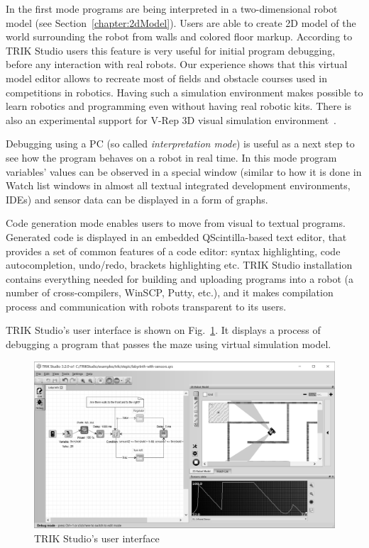 \documentclass[conference]{IEEEtran}
\begin{document}
In the first mode programs are being interpreted in a two-dimensional robot model (see Section~\ref{chapter:2dModel}). Users are able to create 2D model of the world surrounding the robot from walls and colored floor markup. According to TRIK Studio users this feature is very useful for initial program debugging, before any interaction with real robots. Our experience shows that this virtual model editor allows to recreate most of fields and obstacle courses used in competitions in robotics. Having such a simulation environment makes possible to learn robotics and programming even without having real robotic kits. There is also an experimental support for V-Rep 3D visual simulation environment~\cite{rohmer2013v}.

Debugging using a PC (so called \textit{interpretation mode}) is useful as a next step to see how the program behaves on a robot in real time. In this mode program variables' values can be observed in a special window (similar to how it is done in Watch list windows in almost all textual integrated development environments, IDEs) and sensor data can be displayed in a form of graphs. 

Code generation mode enables users to move from visual to textual programs. Generated code is displayed in an embedded QScintilla-based text editor, that provides a set of common features of a code editor: syntax highlighting, code autocompletion, undo/redo, brackets highlighting etc. TRIK Studio installation contains everything needed for building and uploading programs into a robot (a number of cross-compilers, WinSCP, Putty, etc.), and it makes compilation process and communication with robots transparent to its users.

TRIK Studio's user interface is shown on Fig.~\ref{image:TS_interface}. It displays a process of debugging a program that passes the maze using virtual simulation model.

\begin{figure}[ht]
    \includegraphics[width=\textwidth]{TS_CF_Labyrinth.png}
    \caption{TRIK Studio's user interface}
    \label{image:TS_interface}
\end{figure}
\end{document}
